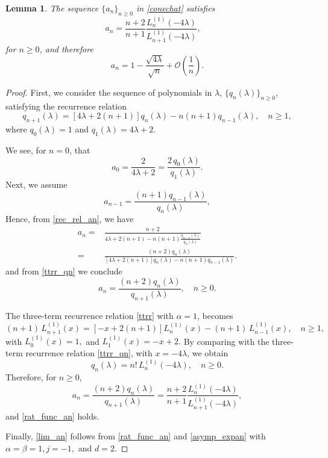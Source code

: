 \documentclass[reqno,10pt]{amsart}
\theoremstyle{plain}
\newtheorem{lemma}[theorem]{Lemma}
\numberwithin{equation}{section}
\numberwithin{figure}{section}
\begin{document}
\begin{lemma} The sequence $\{a_n\}_{n\geq 0}$ in \eqref{conechat} satisfies
\begin{equation} \label{rat_func_an}
a_n  = \frac{n+2}{n+1} \frac{L^{(1)}_{n}(-4\lambda)}{ L^{(1)}_{n+1}(-4\lambda)}, \quad
\end{equation}
for $n\geqslant 0$, and therefore
\begin{equation} \label{lim_an}
 a_n =1 - \frac{\sqrt{4\lambda}}{\sqrt{n}} +\mathcal{O}(\frac{1}{n}) .
\end{equation}
\end{lemma}
\begin{proof}
First, we consider the sequence of polynomials in $\lambda$, $\{q_n(\lambda)\}_{n\geqslant 0}$, satisfying the recurrence relation
\begin{equation} \label{ttrr_qn}
q_{n+1}(\lambda) = [ 4\lambda +2(n+1)] q_{n}(\lambda) -n(n+1) q_{n-1}(\lambda), \quad n\geqslant 1,
\end{equation}
where  $q_{0}(\lambda) = 1 $ and $q_{1}(\lambda)= 4\lambda +2$.


We see, for $n=0$, that
$$
a_0 = \frac{2}{4 \lambda + 2} = \frac{2 \,q_{0}(\lambda)}{q_{1}(\lambda)}.
$$
Next, we assume
$$
a_{n-1} = \frac{(n+1) q_{n-1}(\lambda)}{q_{n}(\lambda)},
$$
Hence, from \eqref{rec_rel_an}, we have
\begin{align*}
a_n = &  \frac{n+2}{4 \lambda + 2(n+1) - n  (n+1)\frac{ q_{n-1}(\lambda)}{q_{n}(\lambda)}
} \\
= &  \frac{(n+2)q_{n}(\lambda)}{[4 \lambda + 2(n+1)]q_{n}(\lambda) - n  (n+1) q_{n-1}(\lambda)}.
\end{align*}
and from \eqref{ttrr_qn} we conclude
$$
a_n  = \frac{(n+2) q_{n}(\lambda)}{q_{n+1}(\lambda)}, \quad n\geqslant 0.
$$

The three-term recurrence relation \eqref{ttrr} with $\alpha =1$, becomes
$$ (n+1)\,L_{n+1}^{(1)}(x) = [-x+ 2(n+1) ]L_{n}^{(1)}(x) - (n+1) \,L_{n-1}^{(1)}(x), \quad n\geqslant 1,
$$
with $ L_{0}^{(1)}(x) =1, $ and $ L_{1}^{(1)}(x) = -x+2.$
By comparing  with the three-term recurrence relation \eqref{ttrr_qn}, with $x=-4\lambda$, we obtain
$$
q_n(\lambda) =  n! \, L_{n}^{(1)}(-4\lambda), \quad
n \geqslant 0.
$$
Therefore, for  $n\geqslant 0$,
$$
a_n  = \frac{(n+2) q_{n}(\lambda)}{q_{n+1}(\lambda)}
=  \frac{n+2}{n+1}
\frac{L^{(1)}_{n}(-4\lambda)}{L^{(1)}_{n+1}(-4\lambda)},
$$
and \eqref{rat_func_an} holds.

Finally, \eqref{lim_an} follows from \eqref{rat_func_an} and \eqref{asymp_expan}
with $\alpha = \beta = 1, j = -1,$ and $d=2$.
\end{proof}
\end{document}
